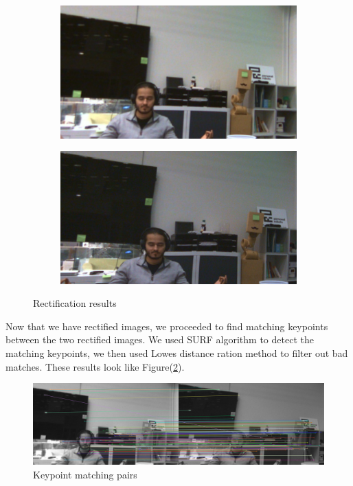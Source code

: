 \documentclass[12pt,letterpaper]{article}
\begin{document}
\begin{figure}[htb]
	\centering
	\begin{subfigure}[c]{0.4\linewidth} 
		\includegraphics[width=\linewidth]{./images/stereo_calibrated_left.png}
	\end{subfigure}
	\begin{subfigure}[c]{0.4\linewidth}
		\includegraphics[width=\linewidth]{./images/stereo_calibrated_right.png}
	\end{subfigure}
	\caption{Rectification results}
	\label{rectification_results}
\end{figure}

Now that we have rectified images, we proceeded to find matching keypoints between the two rectified images. We used SURF algorithm to detect the matching keypoints, we then used Lowes distance ration method to filter out bad matches. These results look like Figure(\ref{keypoint_matching}).

\begin{figure}[hbt]
	\centering
	\includegraphics[width=0.8\linewidth]{./images/eval2_matches_9.png}
	\caption{Keypoint matching pairs}
	\label{keypoint_matching}
\end{figure}
\end{document}
